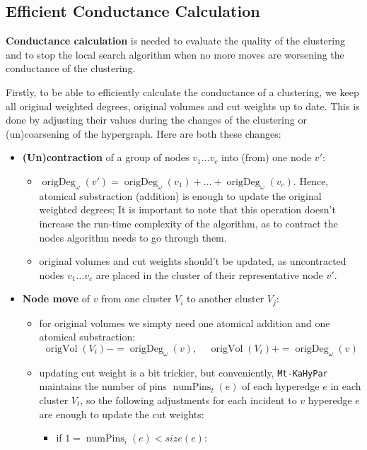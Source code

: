 \documentclass[acmsmall,nonacm,screen,review]{acmart}
\DeclareMathOperator{\origVol}{origVol}
\DeclareMathOperator{\origDeg}{origDeg}
\DeclareMathOperator{\numPins}{numPins}
\begin{document}
\subsection{Efficient Conductance Calculation}
\noindent\textbf{Conductance calculation} is needed to evaluate the
quality of the clustering and to stop the local search algorithm
when no more moves are worsening the conductance of the clustering.

Firstly, to be able to efficiently calculate the conductance of a clustering, 
we keep all original weighted degrees, original volumes and cut weights
up to date. This is done by adjusting their values during the changes of
the clustering or (un)coarsening of the hypergraph. Here are both these 
changes:

\begin{itemize}
    \item \textbf{(Un)contraction} of a group of nodes $v_1 \dots v_c$ into (from) 
one node $v'$:
\begin{itemize}
    \item $\origDeg_\omega(v') = \origDeg_\omega(v_1) + \dots + \origDeg_\omega(v_c)$. 
Hence, atomical substraction (addition) is enough to update the original 
weighted degrees; It is important to note that this operation doesn't increase 
the run-time complexity of the algorithm, as to contract the nodes algorithm needs
to go through them.
    \item original volumes and cut weights 
should't be updated, as uncontracted nodes $v_1 \dots v_c$ are placed in the cluster 
of their representative node $v'$.
\end{itemize}
    \item \textbf{Node move} of $v$ from one cluster $V_i$ to another cluster $V_j$:
\begin{itemize}
    \item for original volumes we simpty need one atomical addition and one atomical
substraction:
\[\origVol(V_i) -= \origDeg_\omega(v), \ \ \ \ \ \origVol(V_i) += \origDeg_\omega(v)\]

    \item updating cut weight is a bit trickier, but conveniently, \texttt{Mt-KaHyPar}
maintains the number of pins $\numPins_t(e)$ of each hyperedge $e$ in each cluster $V_t$, 
so the following adjustments for each incident to $v$ hyperedge $e$ are enough to 
update the cut weights:
\begin{itemize}
    \item if $1 = \numPins_i(e) < size(e)$: 


\end{itemize}
\end{itemize}
\end{itemize}
\end{document}
